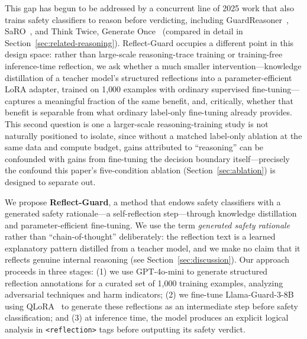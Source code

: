 \documentclass[superintelligence,article,submit,pdftex,moreauthors]{Definitions/mdpi}
\begin{document}
This gap has begun to be addressed by a concurrent line of 2025 work that also trains safety classifiers to reason before verdicting, including GuardReasoner~\citep{liu2025guardreasoner}, SaRO~\citep{mou2025saro}, and Think Twice, Generate Once~\citep{phan2025thinktwice} (compared in detail in Section~\ref{sec:related-reasoning}). Reflect-Guard occupies a different point in this design space: rather than large-scale reasoning-trace training or training-free inference-time reflection, we ask whether a much smaller intervention---knowledge distillation of a teacher model's structured reflections into a parameter-efficient LoRA adapter, trained on 1{,}000 examples with ordinary supervised fine-tuning---captures a meaningful fraction of the same benefit, and, critically, whether that benefit is separable from what ordinary label-only fine-tuning already provides. This second question is one a larger-scale reasoning-training study is not naturally positioned to isolate, since without a matched label-only ablation at the same data and compute budget, gains attributed to ``reasoning'' can be confounded with gains from fine-tuning the decision boundary itself---precisely the confound this paper's five-condition ablation (Section~\ref{sec:ablation}) is designed to separate out.

We propose \textbf{Reflect-Guard}, a method that endows safety classifiers with a generated safety rationale---a self-reflection step---through knowledge distillation and parameter-efficient fine-tuning. We use the term \emph{generated safety rationale} rather than ``chain-of-thought'' deliberately: the reflection text is a learned explanatory pattern distilled from a teacher model, and we make no claim that it reflects genuine internal reasoning (see Section~\ref{sec:discussion}). Our approach proceeds in three stages: (1) we use GPT-4o-mini to generate structured reflection annotations for a curated set of 1{,}000 training examples, analyzing adversarial techniques and harm indicators; (2) we fine-tune Llama-Guard-3-8B using QLoRA~\citep{dettmers2024qlora} to generate these reflections as an intermediate step before safety classification; and (3) at inference time, the model produces an explicit logical analysis in \texttt{<reflection>} tags before outputting its safety verdict.
\end{document}
